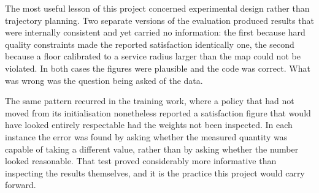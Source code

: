 The most useful lesson of this project concerned experimental design rather than trajectory planning. Two separate versions of the evaluation produced results that were internally consistent and yet carried no information: the first because hard quality constraints made the reported satisfaction identically one, the second because a floor calibrated to a service radius larger than the map could not be violated. In both cases the figures were plausible and the code was correct. What was wrong was the question being asked of the data.

The same pattern recurred in the training work, where a policy that had not moved from its initialisation nonetheless reported a satisfaction figure that would have looked entirely respectable had the weights not been inspected. In each instance the error was found by asking whether the measured quantity was capable of taking a different value, rather than by asking whether the number looked reasonable. That test proved considerably more informative than inspecting the results themselves, and it is the practice this project would carry forward.

